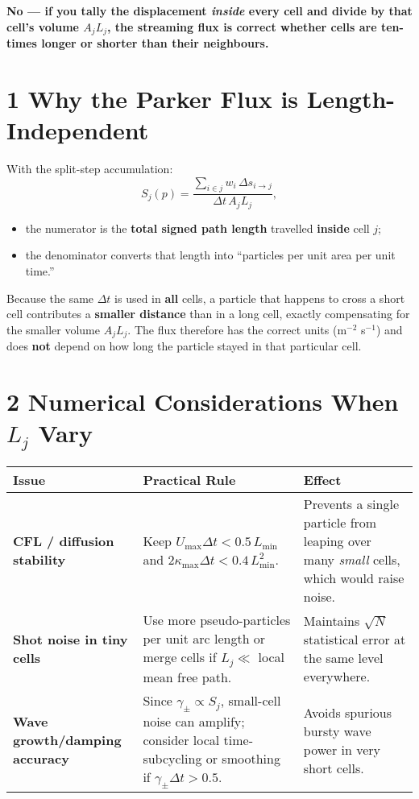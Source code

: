 \textbf{No — if you tally the displacement \emph{inside} every cell and divide by that cell’s volume $A_jL_j$, the streaming flux is correct whether cells are ten-times longer or shorter than their neighbours.}

\bigskip

\section*{1 \quad Why the Parker Flux is Length-Independent}

With the split-step accumulation:
\[
S_j(p) =
\frac{\displaystyle\sum_{i \in j} w_i\,\Delta s_{i \to j}}
     {\Delta t\,A_j L_j},
\]
\begin{itemize}
  \item the numerator is the \textbf{total signed path length} travelled \textbf{inside} cell $j$;
  \item the denominator converts that length into “particles per unit area per unit time.”
\end{itemize}

Because the same $\Delta t$ is used in \textbf{all} cells, a particle that happens to cross a short cell contributes a \textbf{smaller distance} than in a long cell, exactly compensating for the smaller volume $A_jL_j$. The flux therefore has the correct units (m$^{-2}$ s$^{-1}$) and does \textbf{not} depend on how long the particle stayed in that particular cell.

\bigskip

\section*{2 \quad Numerical Considerations When $L_j$ Vary}

\begin{tabular}{|p{4.2cm}|p{6.5cm}|p{5.5cm}|}
\hline
\textbf{Issue} & \textbf{Practical Rule} & \textbf{Effect} \\
\hline
\textbf{CFL / diffusion stability} & Keep $U_{\max} \Delta t < 0.5\,L_{\min}$ and $2\kappa_{\max} \Delta t < 0.4\,L_{\min}^{2}$. & Prevents a single particle from leaping over many \emph{small} cells, which would raise noise. \\
\hline
\textbf{Shot noise in tiny cells} & Use more pseudo-particles per unit arc length or merge cells if $L_j \ll$ local mean free path. & Maintains $\sqrt{N}$ statistical error at the same level everywhere. \\
\hline
\textbf{Wave growth/damping accuracy} & Since $\gamma_\pm \propto S_j$, small-cell noise can amplify; consider local time-subcycling or smoothing if $\gamma_\pm \Delta t > 0.5$. & Avoids spurious bursty wave power in very short cells. \\
\hline
\end{tabular}

